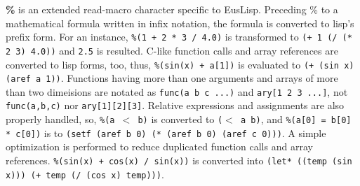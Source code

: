{\bf \%} is an extended read-macro character specific to EusLisp.
Preceding \% to a mathematical formula written in infix notation,
the formula is converted to lisp's prefix form. For an instance,
{\tt \%(1 + 2 * 3 / 4.0)} is transformed to
{\tt (+ 1 (/ (* 2 3) 4.0))} and {\tt 2.5} is resulted.
C-like function calls and array references are converted to lisp forms, too,
thus, {\tt \%(sin(x) + a[1])}
is evaluated to {\tt  (+ (sin x) (aref a 1))}.
Functions having more than one arguments and arrays of more than two
dimeisions are notated as {\tt func(a b c ...)} and {\tt ary[1 2 3 ...]},
not {\tt func(a,b,c)} nor {\tt ary[1][2][3]}.
Relative expressions and assignments are also properly handled, so,
{\tt \%(a $<$ b)} is converted to {\tt ($<$ a b)},
and {\tt \%(a[0] = b[0] * c[0])} is to
{\tt (setf (aref b 0) (* (aref b 0) (aref c 0)))}.
A simple optimization is performed to reduce duplicated function calls and
array references.
{\tt \%(sin(x) + cos(x) / sin(x))} is converted into 
{\tt (let* ((temp (sin x))) (+ temp (/ (cos x) temp)))}.

